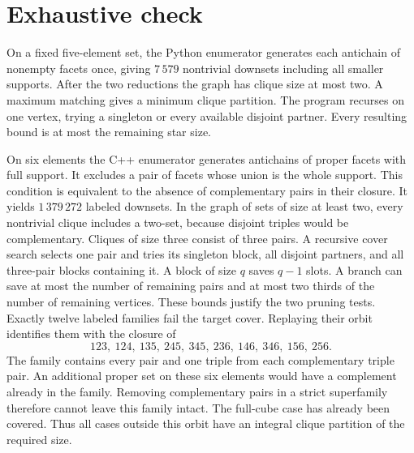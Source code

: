 \documentclass[10pt]{article}
\begin{document}
\section{Exhaustive check}
On a fixed five-element set, the Python enumerator generates each antichain
of nonempty facets once, giving $7\,579$ nontrivial downsets including all
smaller supports. After the two reductions the graph has clique size at
most two. A maximum matching gives a minimum clique partition. The program
recurses on one vertex, trying a singleton or every available disjoint
partner. Every resulting bound is at most the remaining star size.

On six elements the C++ enumerator generates antichains of proper facets
with full support. It excludes a pair of facets whose union is the whole
support. This condition is equivalent to the absence of complementary
pairs in their closure. It yields $1\,379\,272$ labeled downsets. In the
graph of sets of size at least two, every nontrivial clique includes a
two-set, because disjoint triples would be complementary. Cliques of size
three consist of three pairs. A recursive cover search selects one pair
and tries its singleton block, all disjoint partners, and all three-pair
blocks containing it. A block of size $q$ saves $q-1$ slots. A branch can
save at most the number of remaining pairs and at most two thirds of the
number of remaining vertices. These bounds justify the two pruning tests.
Exactly twelve labeled families fail the target cover. Replaying their
orbit identifies them with the closure of
\begin{equation}\label{eq:facets}
123,\ 124,\ 135,\ 245,\ 345,\ 236,\ 146,\ 346,\ 156,\ 256.
\end{equation}
The family contains every pair and one triple from each complementary
triple pair. An additional proper set on these six elements would have a
complement already in the family. Removing complementary pairs in a
strict superfamily therefore cannot leave this family intact. The
full-cube case has already been covered. Thus all cases outside this
orbit have an integral clique partition of the required size.
\end{document}
